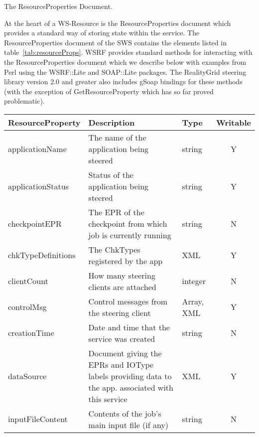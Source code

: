 \documentclass[a4paper]{article}
\begin{document}

\begin{section}{The ResourceProperties Document.}
\label{sec:RPDoc}

At the heart of a WS-Resource is the ResourceProperties document which
provides a standard way of storing state within the service.  The
ResourceProperties document of the SWS contains the elements listed in
table~\ref{tab:resourceProps}.  WSRF provides standard methods for
interacting with the ResourceProperties document which we describe
below with examples from Perl using the WSRF::Lite and SOAP::Lite
packages.  The RealityGrid steering library version 2.0 and greater
also includes gSoap bindings for these methods (with the exception
of GetResourceProperty which has so far proved problematic).

\begin{table}
\begin{center}
\begin{tabular}{l|p{6cm}|l|c}
\hline\hline
ResourceProperty   & Description & Type & Writable\\
\hline
applicationName    & The name of the application being steered & string & Y\\
applicationStatus  & Status of the application being steered & string & Y\\
checkpointEPR      & The EPR of the checkpoint from which job is currently running & string & N\\
chkTypeDefinitions & The ChkTypes registered by the app & XML & Y\\
clientCount        & How many steering clients are attached & integer & N\\
controlMsg         & Control messages from the steering client & Array, XML & Y\\
creationTime       & Date and time that the service was created & string & N\\
dataSource         & Document giving the EPRs and IOType labels providing data to the app. associated with this service & XML & Y\\ 
inputFileContent   & Contents of the job's main input file (if any) & string & N\\


\end{tabular}
\end{center}
\end{table}
\end{section}
\end{document}
